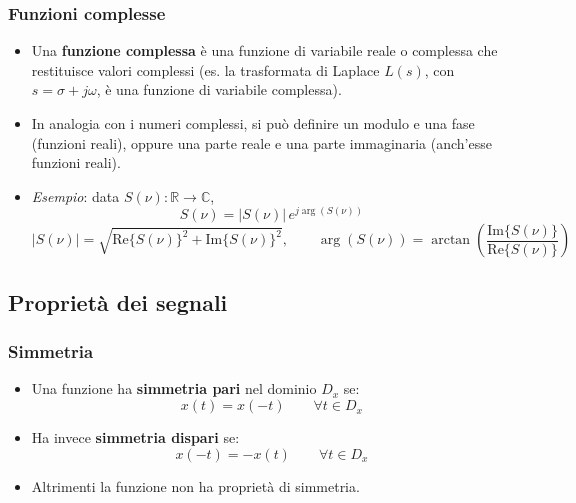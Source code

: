 \documentclass[12pt, a4paper]{article}
\begin{document}
\subsubsection{Funzioni complesse}
\begin{itemize}
    \item Una \textbf{funzione complessa} è una funzione di variabile reale o complessa che restituisce valori complessi (es. la trasformata di Laplace $L(s)$, con $s=\sigma+j\omega$, è una funzione di variabile complessa).
    \item In analogia con i numeri complessi, si può definire un modulo e una fase (funzioni reali), oppure una parte reale e una parte immaginaria (anch'esse funzioni reali).
    \item \textit{Esempio}: data $S(\nu): \mathbb{R}\to\mathbb{C}$,
    $$S(\nu) = |S(\nu)|\, e^{j\arg(S(\nu))}$$
    $$|S(\nu)| = \sqrt{\text{Re}\{S(\nu)\}^2+\text{Im}\{S(\nu)\}^2}, \qquad \arg(S(\nu)) = \arctan\left(\frac{\text{Im}\{S(\nu)\}}{\text{Re}\{S(\nu)\}}\right)$$
\end{itemize}

\subsection{Proprietà dei segnali}

\subsubsection{Simmetria}
\begin{itemize}
    \item Una funzione ha \textbf{simmetria pari} nel dominio $D_x$ se:
    $$x(t) = x(-t) \qquad \forall t \in D_x$$
    \item Ha invece \textbf{simmetria dispari} se:
    $$x(-t) = -x(t) \qquad \forall t \in D_x$$
    \item Altrimenti la funzione non ha proprietà di simmetria.
\end{itemize}
\end{document}
